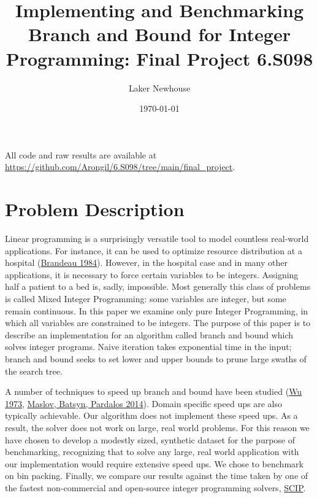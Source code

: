 \documentclass{article}
\title{Implementing and Benchmarking Branch and Bound for Integer Programming: Final Project 6.S098}
\author{Laker Newhouse}
\date{\today}
\begin{document}
\maketitle	

All code and raw results are available at \url{https://github.com/Arongil/6.S098/tree/main/final_project}. \\

\section*{Problem Description}

Linear programming is a surprisingly versatile tool to model countless real-world applications. For instance, it can be used to optimize resource distribution at a hospital (\href{https://pubmed.ncbi.nlm.nih.gov/6232215/}{Brandeau 1984}). However, in the hospital case and in many other applications, it is necessary to force certain variables to be integers. Assigning half a patient to a bed is, sadly, impossible. Most generally this class of problems is called Mixed Integer Programming: some variables are integer, but some remain continuous. In this paper we examine only pure Integer Programming, in which all variables are constrained to be integers. The purpose of this paper is to describe an implementation for an algorithm called branch and bound which solves integer programs. Naive iteration takes exponential time in the input; branch and bound seeks to set lower and upper bounds to prune large swaths of the search tree.

A number of techniques to speed up branch and bound have been studied (\href{https://digitalcommons.usu.edu/cgi/viewcontent.cgi?article=2179&context=gradreports}{Wu 1973}, \href{https://www.researchgate.net/publication/257588965_Speeding_up_branch_and_bound_algorithms_for_solving_the_maximum_clique_problem}{Maslov, Batsyn, Pardalos 2014}). Domain specific speed ups are also typically achievable. Our algorithm does not implement these speed ups. As a result, the solver does not work on large, real world problems. For this reason we have chosen to develop a modestly sized, synthetic dataset for the purpose of benchmarking, recognizing that to solve any large, real world application with our implementation would require extensive speed ups. We chose to benchmark on bin packing. Finally, we compare our results against the time taken by one of the fastest non-commercial and open-source integer programming solvers, \href{https://www.scipopt.org/}{SCIP}.
\end{document}
